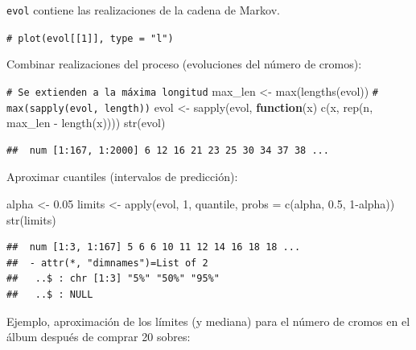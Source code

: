 \documentclass[
]{book}
\newenvironment{Shaded}{\begin{snugshade}}{\end{snugshade}}
\newcommand{\AttributeTok}[1]{\textcolor[rgb]{0.77,0.63,0.00}{#1}}
\newcommand{\CommentTok}[1]{\textcolor[rgb]{0.56,0.35,0.01}{\textit{#1}}}
\newcommand{\ControlFlowTok}[1]{\textcolor[rgb]{0.13,0.29,0.53}{\textbf{#1}}}
\newcommand{\DecValTok}[1]{\textcolor[rgb]{0.00,0.00,0.81}{#1}}
\newcommand{\FloatTok}[1]{\textcolor[rgb]{0.00,0.00,0.81}{#1}}
\newcommand{\FunctionTok}[1]{\textcolor[rgb]{0.00,0.00,0.00}{#1}}
\newcommand{\NormalTok}[1]{#1}
\newcommand{\OtherTok}[1]{\textcolor[rgb]{0.56,0.35,0.01}{#1}}
\newcommand{\SpecialCharTok}[1]{\textcolor[rgb]{0.00,0.00,0.00}{#1}}
\theoremstyle{break}
\theoremstyle{nonumberplain}
\renewcommand{\CommentTok}[1]{\textcolor[rgb]{0.41,0.41,0.41}{\texttt{#1}}}
\begin{document}
\texttt{evol} contiene las realizaciones de la cadena de Markov.

\begin{Shaded}
\begin{Highlighting}[]
\CommentTok{\# plot(evol[[1]], type = "l")}
\end{Highlighting}
\end{Shaded}

Combinar realizaciones del proceso (evoluciones del número de cromos):

\begin{Shaded}
\begin{Highlighting}[]
\CommentTok{\# Se extienden a la máxima longitud}
\NormalTok{max\_len }\OtherTok{\textless{}{-}} \FunctionTok{max}\NormalTok{(}\FunctionTok{lengths}\NormalTok{(evol)) }\CommentTok{\# max(sapply(evol, length))}
\NormalTok{evol }\OtherTok{\textless{}{-}} \FunctionTok{sapply}\NormalTok{(evol, }\ControlFlowTok{function}\NormalTok{(x) }\FunctionTok{c}\NormalTok{(x, }\FunctionTok{rep}\NormalTok{(n, max\_len }\SpecialCharTok{{-}} \FunctionTok{length}\NormalTok{(x))))}
\FunctionTok{str}\NormalTok{(evol)}
\end{Highlighting}
\end{Shaded}

\begin{verbatim}
##  num [1:167, 1:2000] 6 12 16 21 23 25 30 34 37 38 ...
\end{verbatim}

Aproximar cuantiles (intervalos de predicción):

\begin{Shaded}
\begin{Highlighting}[]
\NormalTok{alpha }\OtherTok{\textless{}{-}} \FloatTok{0.05}
\NormalTok{limits }\OtherTok{\textless{}{-}} \FunctionTok{apply}\NormalTok{(evol, }\DecValTok{1}\NormalTok{, quantile, }\AttributeTok{probs =} \FunctionTok{c}\NormalTok{(alpha, }\FloatTok{0.5}\NormalTok{, }\DecValTok{1}\SpecialCharTok{{-}}\NormalTok{alpha))}
\FunctionTok{str}\NormalTok{(limits)}
\end{Highlighting}
\end{Shaded}

\begin{verbatim}
##  num [1:3, 1:167] 5 6 6 10 11 12 14 16 18 18 ...
##  - attr(*, "dimnames")=List of 2
##   ..$ : chr [1:3] "5%" "50%" "95%"
##   ..$ : NULL
\end{verbatim}

Ejemplo, aproximación de los límites (y mediana) para el número de cromos en el álbum después de comprar 20 sobres:
\end{document}
